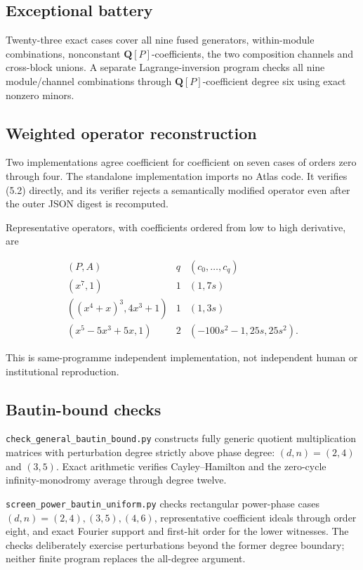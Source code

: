 \documentclass[
  11pt,
  a4paper,
]{amsart}
\begin{document}
\subsection{Exceptional battery}

Twenty-three exact cases cover all nine fused generators, within-module
combinations, nonconstant \(\mathbf Q[P]\)-coefficients, the two
composition channels and cross-block unions. A separate
Lagrange-inversion program checks all nine module/channel combinations
through \(\mathbf Q[P]\)-coefficient degree six using exact nonzero
minors.

\subsection{Weighted operator reconstruction}

Two implementations agree coefficient for coefficient on seven cases of
orders zero through four. The standalone implementation imports no Atlas
code. It verifies (5.2) directly, and its verifier rejects a
semantically modified operator even after the outer JSON digest is
recomputed.

Representative operators, with coefficients ordered from low to high
derivative, are

\[
\begin{array}{c|c|c}
(P,A)&q&(c_0,\ldots,c_q)\\ \hline
(x^7,1)&1&(1,7s)\\
((x^4+x)^3,4x^3+1)&1&(1,3s)\\
(x^5-5x^3+5x,1)&2&(-100s^2-1,25s,25s^2).
\end{array}
\]

This is same-programme independent implementation, not independent human
or institutional reproduction.

\subsection{Bautin-bound checks}

\texttt{check\_general\_bautin\_bound.py} constructs fully generic
quotient multiplication matrices with perturbation degree strictly above
phase degree: \((d,n)=(2,4)\) and \((3,5)\). Exact arithmetic verifies
Cayley--Hamilton and the zero-cycle infinity-monodromy average through
degree twelve.

\texttt{screen\_power\_bautin\_uniform.py} checks rectangular
power-phase cases \((d,n)=(2,4),(3,5),(4,6)\), representative
coefficient ideals through order eight, and exact Fourier support and
first-hit order for the lower witnesses. The checks deliberately
exercise perturbations beyond the former degree boundary; neither finite
program replaces the all-degree argument.
\end{document}
